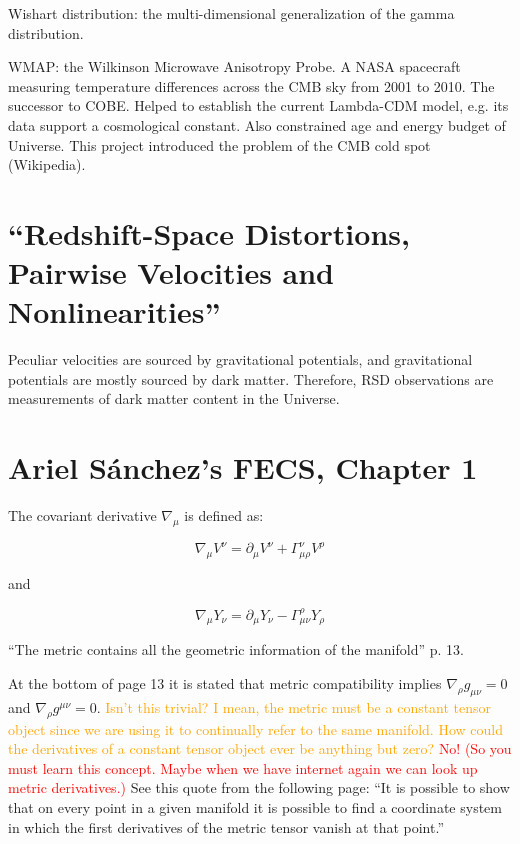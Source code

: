 \documentclass[11pt]{article}
\begin{document}
Wishart distribution: the multi-dimensional generalization of the gamma
distribution.

WMAP: the Wilkinson Microwave Anisotropy Probe. A NASA spacecraft measuring
temperature differences across the CMB sky from 2001 to 2010. The successor to
COBE. Helped to establish the current Lambda-CDM model, e.g. its data support
a cosmological constant. Also constrained age and energy budget of Universe.
This project introduced the problem of the CMB cold spot (Wikipedia).

\section{``Redshift-Space Distortions, Pairwise Velocities and
Nonlinearities''}

Peculiar velocities are sourced by gravitational potentials, and gravitational
potentials are mostly sourced by dark matter. Therefore, RSD observations are
measurements of dark matter content in the Universe.

\section{Ariel S\'{a}nchez's FECS, Chapter 1}

The covariant derivative $\nabla_\mu$ is defined as:

\begin{equation}
	\nabla_\mu V^\nu = \partial_\mu V^\nu + \Gamma^\nu_{\mu \rho} V^\rho
\end{equation}

and

\begin{equation}
	\nabla_\mu Y_\nu = \partial_\mu Y_\nu - \Gamma^\rho_{\mu \nu} Y_\rho
\end{equation}

``The metric contains all the geometric information of the manifold'' p. 13.

At the bottom of page 13 it is stated that metric compatibility implies
$\nabla_\rho g_{\mu \nu} = 0$ and $\nabla_\rho  g^{\mu \nu} = 0$.
\textcolor{orange}{Isn't this trivial? I mean, the metric must be a constant
tensor object since we are using it to continually refer to the same manifold.
How could the derivatives of a constant tensor object ever be anything but
zero?} \textcolor{red}{No! (So you must learn this concept. Maybe when we have
internet again we can look up metric derivatives.)} See this quote from the
following page: ``It is possible to show that on every point in a given
manifold it is possible to find a coordinate system in which the first
derivatives of the metric tensor vanish at that point.''
\end{document}

